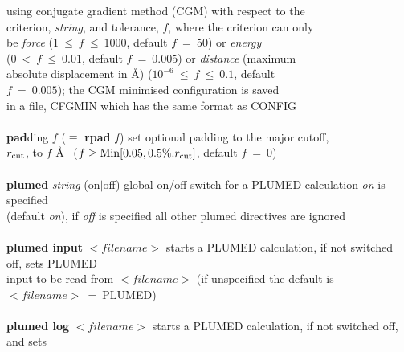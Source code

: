 \begin{tabbing}
\>                                              \> using conjugate gradient method (CGM) with respect to the \\
\>                                              \> criterion, {\em string}, and tolerance, $f$, where the criterion can only \\
\>                                              \> be {\em force} ($1~\le~f~\le~1000$, default $f~=~50$) or {\em energy} \\
\>                                              \> ($0~<~f~\le~0.01$, default $f~=~0.005$) or {\em distance} (maximum \\
\>                                              \> absolute displacement in \AA) ($10^{-6}~\le~f~\le~0.1$, default \\
\>                                              \> $f~=~0.005$); the CGM minimised configuration is saved \\
\>                                              \> in a file, CFGMIN which has the same format as CONFIG \\
\>                                              \> \\
\> {\bf pad}ding $f$  ($\equiv$ {\bf rpad} $f$) \> set optional padding to the major cutoff, \\
\>                                              \> $r_{\rm cut}$, to $f$ \AA~ ($f \ge {\rm Min}[0.05,0.5\%.r_{\rm cut}]$, default $f~=~0$) \\
\>                                              \> \\
\> {\bf plumed} {\em string} (on$|$off)         \> global on/off switch for a PLUMED calculation  {\em on} is specified \\
\>                                              \> (default {\em on}), if {\em off} is specified all other plumed directives are ignored \\
\>                                              \> \\
\> {\bf plumed input} $<$$filename$$>$          \> starts a PLUMED calculation, if not switched off, sets PLUMED \\
\>                                              \> input to be read from $<$$filename$$>$ (if unspecified the default is \\
\>                                              \> $<$$filename$$>$~=~PLUMED) \\
\>                                              \> \\
\> {\bf plumed log} $<$$filename$$>$            \> starts a PLUMED calculation, if not switched off, and sets \\

\end{tabbing}
